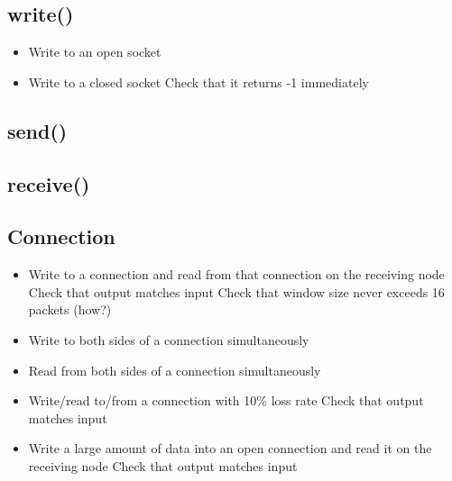 \documentclass[]{article}
\begin{document}
\subsection{write()}
\begin{itemize}
	\item Write to an open socket
	\item Write to a closed socket
	\subitem Check that it returns -1 immediately
\end{itemize}
\subsection{send()}
\subsection{receive()}
\subsection{Connection}
\begin{itemize}
	\item Write to a connection and read from that connection on the receiving node
	\subitem Check that output matches input
	\subitem Check that window size never exceeds 16 packets (how?)
	\item Write to both sides of a connection simultaneously
	\item Read from both sides of a connection simultaneously
	\item Write/read to/from a connection with 10\% loss rate
	\subitem Check that output matches input
	\item Write a large amount of data into an open connection and read it on the receiving node
	\subitem Check that output matches input
\end{itemize}
\end{document}

